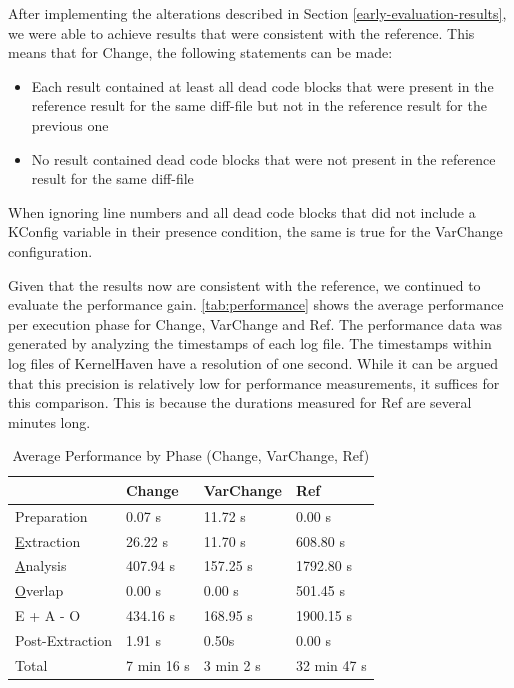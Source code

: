\documentclass[a4paper]{article}
\begin{document}
After implementing the alterations described in Section \ref{early-evaluation-results}, we were able to achieve results that were consistent with the reference. This means that for Change, the following statements can be made:

\begin{itemize}
   \item Each result contained at least all dead code blocks that were present in the reference result for the same diff-file but not in the reference result for the previous one
   \item No result contained dead code blocks that were not present in the reference result for the same diff-file
\end{itemize}

When ignoring line numbers and all dead code blocks that did not include a KConfig variable in their presence condition, the same is true for the VarChange configuration. 

Given that the results now are consistent with the reference, we continued to evaluate the performance gain. \autoref{tab:performance} shows the average performance per execution phase for Change, VarChange and  Ref. The performance data was generated by analyzing the timestamps of each log file. The timestamps within log files of KernelHaven have a resolution of one second. While it can be argued that this precision is relatively low for performance measurements, it suffices for this comparison. This is because the durations measured for Ref are several minutes long.

\begin {table}[h]
\begin{center}
\caption {Average Performance by Phase (Change, VarChange, Ref)} \label{tab:performance} 
\begin{tabular}{|l | l | l | l|}
\hline
                               & Change                 & VarChange          & Ref  \\ \hline
	Preparation                & 0.07 s                & 11.72 s            & 0.00 s \\
	\underline{E}xtraction     & 26.22 s                & 11.70 s            & 608.80 s \\
	\underline{A}nalysis       & 407.94 s               & 157.25 s           & 1792.80 s \\
	\underline{O}verlap        & 0.00 s                 & 0.00 s             & 501.45 s \\
	E + A - O                  & 434.16 s               & 168.95 s           & 1900.15 s \\
	Post-Extraction             & 1.91 s                 & 0.50s              & 0.00 s \\ \hline
	Total                      & 7 min 16 s             & 3 min 2 s          & 32 min 47 s \\ \hline
\end{tabular}
\end{center}
\end{table}
\end{document}
